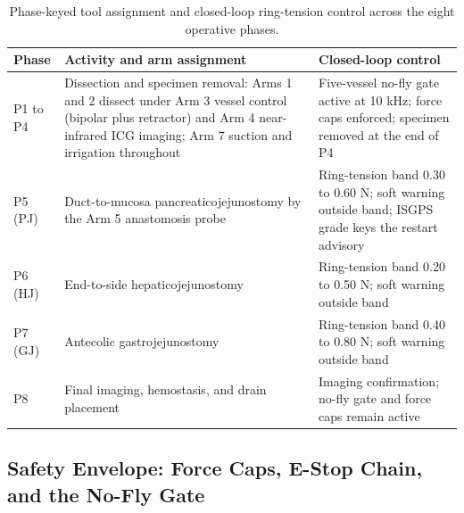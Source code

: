 \begin{table}[t]
\caption{Phase-keyed tool assignment and closed-loop ring-tension control across the eight operative phases.}
\label{tab:sec04-phases}
\centering
\begin{tabularx}{\textwidth}{L{2.0cm} L{5.4cm} Y}
\toprule
\textbf{Phase} & \textbf{Activity and arm assignment} & \textbf{Closed-loop control} \\
\midrule
P1 to P4 & Dissection and specimen removal: Arms 1 and 2 dissect under Arm 3 vessel control (bipolar plus retractor) and Arm 4 near-infrared ICG imaging; Arm 7 suction and irrigation throughout & Five-vessel no-fly gate active at 10 kHz; force caps enforced; specimen removed at the end of P4 \\
P5 (PJ) & Duct-to-mucosa pancreaticojejunostomy by the Arm 5 anastomosis probe & Ring-tension band 0.30 to 0.60 N; soft warning outside band; ISGPS grade keys the restart advisory \\
P6 (HJ) & End-to-side hepaticojejunostomy & Ring-tension band 0.20 to 0.50 N; soft warning outside band \\
P7 (GJ) & Antecolic gastrojejunostomy & Ring-tension band 0.40 to 0.80 N; soft warning outside band \\
P8 & Final imaging, hemostasis, and drain placement & Imaging confirmation; no-fly gate and force caps remain active \\
\bottomrule
\end{tabularx}
\end{table}

\subsection*{Safety Envelope: Force Caps, E-Stop Chain, and the No-Fly Gate}

